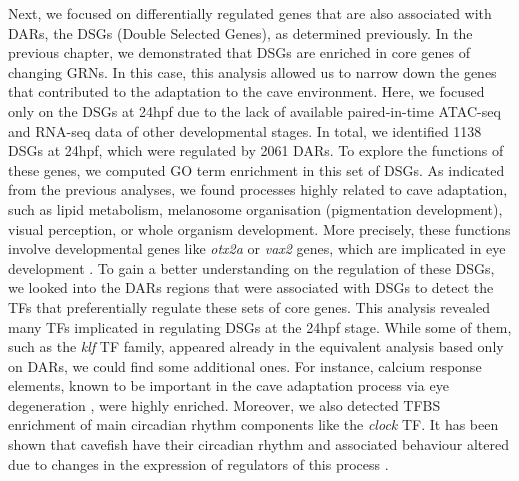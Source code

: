 Next, we focused on differentially regulated genes that are also associated with DARs, the DSGs (Double Selected Genes), as determined previously. In the previous chapter, we demonstrated that DSGs are enriched in core genes of changing GRNs. In this case, this analysis allowed us to narrow down the genes that contributed to the adaptation to the cave environment. Here, we focused only on the DSGs at 24hpf due to the lack of available paired-in-time ATAC-seq and RNA-seq data of other developmental stages. In total, we identified 1138 DSGs at 24hpf, which were regulated by 2061 DARs. To explore the functions of these genes, we computed GO term enrichment in this set of DSGs. As indicated from the previous analyses, we found processes highly related to cave adaptation, such as lipid metabolism, melanosome organisation (pigmentation development), visual perception, or whole organism development. More precisely, these functions involve developmental genes like \textit{otx2a} or \textit{vax2} genes, which are implicated in eye development \parencite{martinez-morales_otx2_2003, buono_analysis_2021}. To gain a better understanding on the regulation of these DSGs, we looked into the DARs regions that were associated with DSGs to detect the TFs that preferentially regulate these sets of core genes. This analysis revealed many TFs implicated in regulating DSGs at the 24hpf stage. While some of them, such as the \textit{klf} TF family, appeared already in the equivalent analysis based only on DARs, we could find some additional ones. For instance, calcium response elements, known to be important in the cave adaptation process via eye degeneration \parencite{keene_biology_2015}, were highly enriched. Moreover, we also detected TFBS enrichment of main circadian rhythm components like the \textit{clock} TF. It has been shown that cavefish have their circadian rhythm and associated behaviour altered due to changes in the expression of regulators of this process \parencite{beale_circadian_2013, olsen_circadian_2023}.








